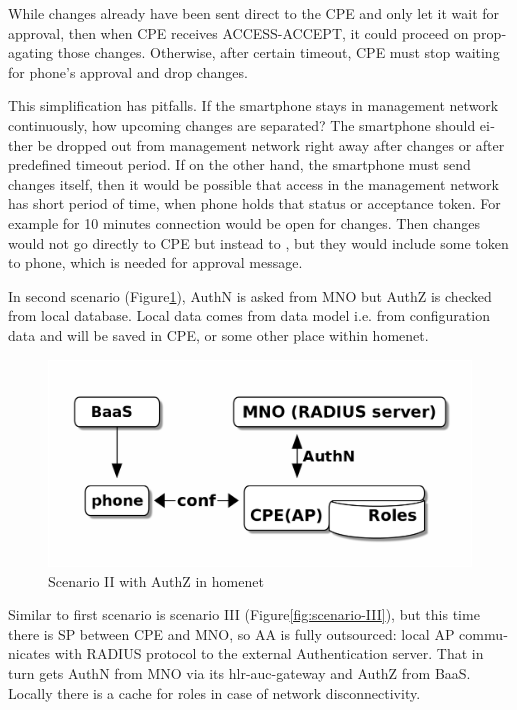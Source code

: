 \documentclass[12pt,a4paper,english]{tutthesis}
\begin{document}
\begin{otherlanguage}{english}
While changes already have been  sent direct to the CPE and only let it
wait for approval, then when CPE receives ACCESS-ACCEPT, it could
proceed on propagating those changes.  Otherwise, after certain timeout, CPE must stop waiting
for phone's approval and drop changes.


This simplification has pitfalls. If the smartphone stays in management
network continuously, how upcoming changes are separated? The smartphone should
either be dropped out from management network right away after changes or
after predefined timeout period.  If on the other hand, the smartphone must
send changes itself, then it would be possible that access in the
management network has short period of time, when phone 
holds that status or acceptance token. For example for 10 minutes connection
would be open for changes. Then changes would not go directly to CPE
but instead to , but they would include some token to phone, which is
needed for approval message.


\label{scenario-ii}

In second scenario (Figure\ref{fig:scenario-II}), AuthN is asked from MNO but
AuthZ is checked from local database. Local data comes from data model
i.e. from configuration data and will be saved in CPE, or some other
place within homenet.


\begin{figure}[htb]
\centering
\includegraphics[width=.9\linewidth]{scenII.png}
\caption{\label{fig:scenario-II}Scenario II with AuthZ in homenet}
\end{figure}


\label{scenario-iii}

Similar to first scenario is scenario III (Figure\ref{fig:scenario-III}), 
but this time there is SP between CPE and MNO, so AA is fully outsourced:
local AP communicates with RADIUS protocol to the external
Authentication server. That in turn gets AuthN from MNO via its
hlr-auc-gateway and AuthZ from BaaS.
Locally there is a cache for roles in case of network disconnectivity.


\end{otherlanguage}
\end{document}
